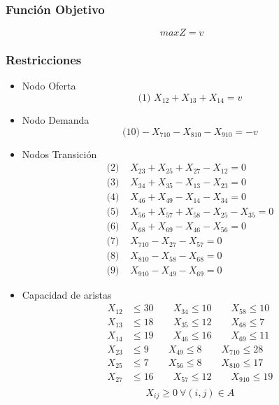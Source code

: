 \documentclass[a4paper,12pt]{article}
\begin{document}
\subsubsection{Función Objetivo}
\begin{equation*}
	maxZ = v
\end{equation*}

\subsubsection{Restricciones}
\begin{itemize}
	\item Nodo Oferta
		\begin{equation*}
		\text{(1) }	X_{12}+X_{13}+X_{14}=v	
		\end{equation*}
	\item Nodo Demanda
		\begin{equation*}
		\text{(10)}	-X_{710}-X_{810}-X_{910}=-v
		\end{equation*}
	\item Nodos Transición
		\begin{equation*}
		\begin{split}
			\text{(2) }&X_{23}+X_{25}+X_{27}-X_{12}=0\\
			\text{(3) }&X_{34}+X_{35}-X_{13}-X_{23}=0\\
			\text{(4) }&X_{46}+X_{49}-X_{14}-X_{34}=0\\
			\text{(5) }&X_{56}+X_{57}+X_{58}-X_{25}-X_{35}=0\\
			\text{(6) }&X_{68}+X_{69}-X_{46}-X_{56}=0\\
			\text{(7) }&X_{710}-X_{27}-X_{57}=0\\
			\text{(8) }&X_{810}-X_{58}-X_{68}=0\\
			\text{(9) }&X_{910}-X_{49}-X_{69}=0
		\end{split}
		\end{equation*}
		\item Capacidad de aristas
		\begin{equation*}
		\begin{split}
			X_{12}&\leq 30 \qquad X_{34}\leq 10 \qquad X_{58}\leq 10\\
			X_{13}&\leq 18 \qquad X_{35}\leq 12 \qquad X_{68}\leq 7\\
			X_{14}&\leq 19 \qquad X_{46}\leq 16 \qquad X_{69}\leq 11\\
			X_{23}&\leq 9 \qquad X_{49}\leq 8 \qquad X_{710}\leq 28\\
			X_{25}&\leq 7 \qquad X_{56}\leq 8 \qquad X_{810}\leq 17\\
			X_{27}&\leq 16 \qquad X_{57}\leq 12 \qquad X_{910}\leq 19\\
		\end{split}
		\end{equation*}
		\begin{equation*}
			X_{ij}\geq 0\ \forall(i,j)\in A
		\end{equation*}
\end{itemize}
\end{document}
